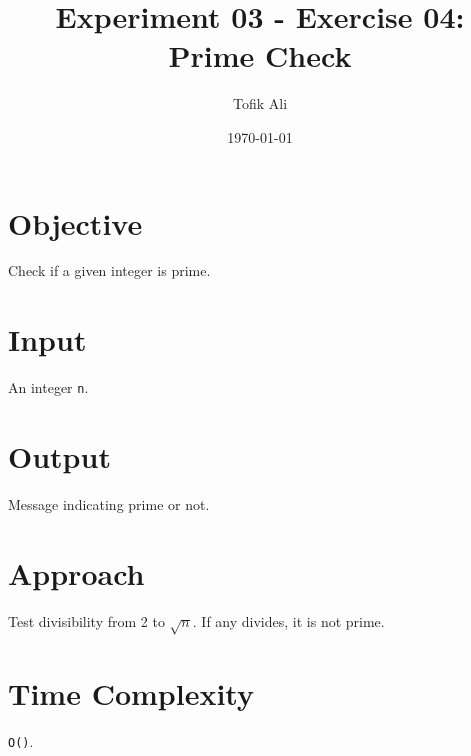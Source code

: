 \documentclass[11pt]{article}
\title{Experiment 03 - Exercise 04: Prime Check}
\author{Tofik Ali}
\date{\today}
\begin{document}
\maketitle
\section*{Objective}
Check if a given integer is prime.
\section*{Input}
An integer \texttt{n}.
\section*{Output}
Message indicating prime or not.
\section*{Approach}
Test divisibility from 2 to \(\sqrt{n}\). If any divides, it is not prime.
\section*{Time Complexity}
\texttt{O()}.
\end{document}
